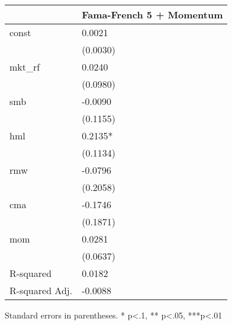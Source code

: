 \begin{table}
\caption{}
\label{}
\begin{center}
\begin{tabular}{ll}
\hline
               & Fama-French 5 + Momentum  \\
\hline
const          & 0.0021                    \\
               & (0.0030)                  \\
mkt\_rf        & 0.0240                    \\
               & (0.0980)                  \\
smb            & -0.0090                   \\
               & (0.1155)                  \\
hml            & 0.2135*                   \\
               & (0.1134)                  \\
rmw            & -0.0796                   \\
               & (0.2058)                  \\
cma            & -0.1746                   \\
               & (0.1871)                  \\
mom            & 0.0281                    \\
               & (0.0637)                  \\
R-squared      & 0.0182                    \\
R-squared Adj. & -0.0088                   \\
\hline
\end{tabular}
\end{center}
\end{table}
\bigskip
Standard errors in parentheses. \newline 
* p<.1, ** p<.05, ***p<.01